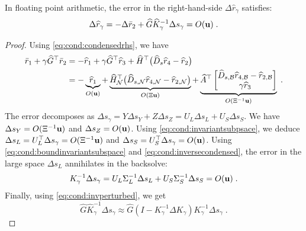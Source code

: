 \begin{proposition}
In floating point arithmetic, the error in the right-hand-side $\Delta \widehat{r}_\gamma$ satisfies:
\begin{equation}
  \label{eq:cond:errorrgamma}
  \Delta \widehat{r}_\gamma = -\Delta \bar{r}_2 + \widehat{G} \widehat{K}_\gamma^{-1} \Delta s_\gamma = O(\mathbf{u}) \;.
\end{equation}
\end{proposition}
\begin{proof}
Using \eqref{eq:cond:condensedrhs}, we have
\begin{equation*}
  \label{eq:cond:boundderivationhykkt}
  \begin{aligned}
  \bar{r}_1 + \gamma \widehat{G}^\top \bar{r}_2 &=
- \widehat{r}_1 + \gamma \widehat{G}^\top \widehat{r}_3+ \widehat{H}^\top\big(\widehat{D}_{s} \widehat{r}_{4} - \widehat{r}_{2} \big) \\
&=  -
\underbrace{\widehat{r}_1}_{O(\mathbf{u})} +
\underbrace{
\widehat{H}_{\mathcal{N}}^\top\big(\widehat{D}_{s,\mathcal{N}} \widehat{r}_{4,\mathcal{N}} - \widehat{r}_{2,\mathcal{N}} \big)}_{O(\Xi \mathbf{u})}
+ \underbrace{\widehat{A}^\top \begin{bmatrix}
  \widehat{D}_{s,\mathcal{B}} \widehat{r}_{4,\mathcal{B}} - \widehat{r}_{2,\mathcal{B}}  \\
  \gamma \widehat{r}_3
\end{bmatrix}}_{O(\Xi^{-1}\mathbf{u})} \; .
  \end{aligned}
\end{equation*}
The error decomposes as $\Delta s_\gamma = Y \Delta s_Y  + Z \Delta s_Z
= U_L \Delta s_L + U_S \Delta s_S$.
We have $\Delta s_Y = O(\Xi^{-1} \mathbf{u})$ and $\Delta s_Z = O(\mathbf{u})$.
Using \eqref{eq:cond:invariantsubpsace}, we deduce
$\Delta s_L = U_L^\top \Delta s_\gamma = O(\Xi^{-1} \mathbf{u})$ and
$\Delta s_S = U_S^\top \Delta s_\gamma = O(\mathbf{u})$.
Using \eqref{eq:cond:boundinvariantsubspace} and \eqref{eq:cond:inversecondensed},
the error in the large space $\Delta s_L$ annihilates in the backsolve:
\begin{equation}
  \label{eq:cond:boundhykkt1}
  K_\gamma^{-1} \Delta s_\gamma = U_L \Sigma_L^{-1} \Delta s_L + U_S \Sigma_S^{-1} \Delta s_S  = O(\mathbf{u})
  \; .
\end{equation}
Finally, using \eqref{eq:cond:invperturbed}, we get
\begin{equation}
  \widehat{G} \widehat{K}_\gamma^{-1} \Delta s_\gamma \approx
  \widehat{G} (I - K_\gamma^{-1}\Delta K_\gamma) K_\gamma^{-1} \Delta s_\gamma \; .

\end{equation}
\end{proof}
